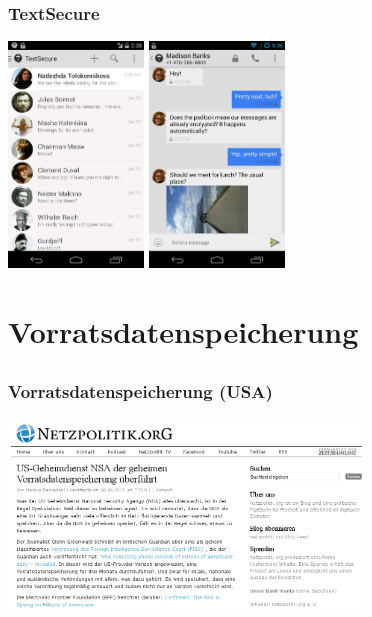 \documentclass[12pt]{beamer}
\begin{document}
\begin{frame}
  \frametitle{TextSecure}
    \begin{center}
      \includegraphics[height=6cm]{img/textsecure1.png}
      \hspace{0.5cm}
      \includegraphics[height=6cm]{img/textsecure2.png}
    \end{center}
\end{frame}

\section{Vorratsdatenspeicherung}
\subsection{}

\begin{frame}
  \frametitle{Vorratsdatenspeicherung (USA)}
    \begin{center}
      \includegraphics[height=5cm]{img/netzpolitik-verizon.png}
    \end{center}
\end{frame}
\end{document}
